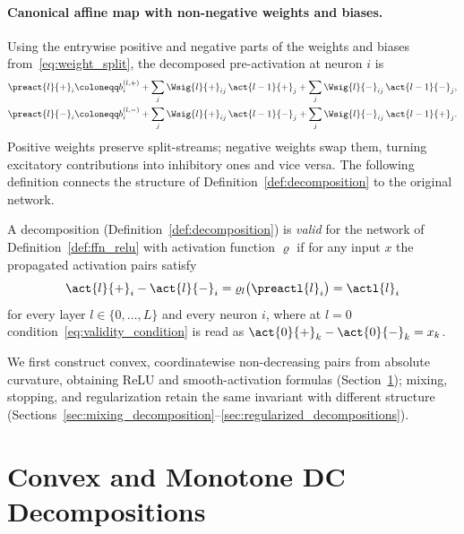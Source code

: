 \paragraph{Canonical affine map with non-negative weights and biases.}
Using the entrywise positive and negative parts of the weights and biases from~\eqref{eq:weight_split}, the decomposed pre-activation at neuron $i$ is
\begin{align}
	\preact{l}{+}_i &\coloneqq b_i^{(l,+)} + \sum_j \Wsig{l}{+}_{ij}\, \act{l-1}{+}_j + \sum_j \Wsig{l}{-}_{ij}\, \act{l-1}{-}_j,
	\label{eq:split_pos}\\
	\preact{l}{-}_i &\coloneqq b_i^{(l,-)} + \sum_j \Wsig{l}{+}_{ij}\, \act{l-1}{-}_j + \sum_j \Wsig{l}{-}_{ij}\, \act{l-1}{+}_j.
	\label{eq:split_neg}
\end{align}
Positive weights preserve split-streams; negative weights swap them, turning excitatory contributions into inhibitory ones and vice versa. The following definition connects the structure of Definition~\ref{def:decomposition} to the original network.

\begin{definition}\label{def:valid_decomposition}
A decomposition (Definition~\ref{def:decomposition}) is \emph{valid} for the network of Definition~\ref{def:ffn_relu} with activation function $\varrho$ if for any input $x$ the propagated activation pairs satisfy
\begin{equation}
	\act{l}{+}_i - \act{l}{-}_i = \varrho_l\bigl(\preactl{l}_i\bigr) = \actl{l}_i
	\label{eq:validity_condition}
\end{equation}
for every layer $l \in \{0, \dots, L\}$ and every neuron $i$, where at $l = 0$ condition~\eqref{eq:validity_condition} is read as $\act{0}{+}_k - \act{0}{-}_k = x_k$.
\end{definition}

We first construct convex, coordinatewise non-decreasing pairs from absolute curvature, obtaining ReLU and smooth-activation formulas (Section~\ref{sec:dc_decompositions}); mixing, stopping, and regularization retain the same invariant with different structure (Sections~\ref{sec:mixing_decomposition}--\ref{sec:regularized_decompositions}).

\section{Convex and Monotone DC Decompositions}\label{sec:dc_decompositions}

